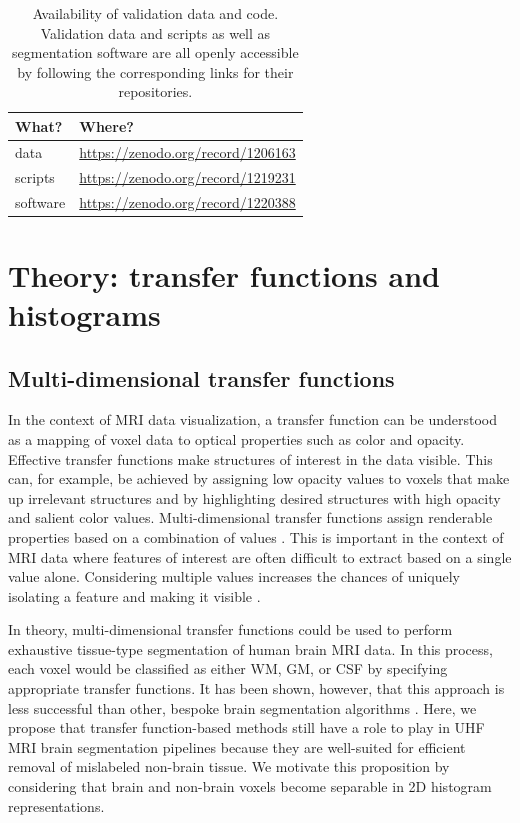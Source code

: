 \begin{table}[!ht]
\centering
\begin{tabular}{l l}
What? & Where? \\\hline
data & \url{https://zenodo.org/record/1206163}\\
scripts & \url{https://zenodo.org/record/1219231}\\
software & \url{https://zenodo.org/record/1220388}
\end{tabular}
\caption{\label{tab:availability}Availability of validation data and code. Validation data and scripts as well as segmentation software are all openly accessible by following the corresponding links for their repositories.}
\end{table}

\section{Theory: transfer functions and histograms}
\label{sec:Theory}

\subsection{Multi-dimensional transfer functions}
In the context of MRI data visualization, a transfer function can be understood as a mapping of voxel data to optical properties such as color and opacity. Effective transfer functions make structures of interest in the data visible. This can, for example, be achieved by assigning low opacity values to voxels that make up irrelevant structures and by highlighting desired structures with high opacity and salient color values. Multi-dimensional transfer functions assign renderable properties based on a combination of values \parencite{Kniss2002, Kindlmann1998, Kniss2005, Kniss2001}. This is important in the context of MRI data where features of interest are often difficult to extract based on a single value alone. Considering multiple values increases the chances of uniquely isolating a feature and making it visible \parencite{Kniss2002}.

In theory, multi-dimensional transfer functions could be used to perform exhaustive tissue-type segmentation of human brain MRI data. In this process, each voxel would be classified as either WM, GM, or CSF by specifying appropriate transfer functions. It has been shown, however, that this approach is less successful than other, bespoke brain segmentation algorithms \parencite{Ljung2016}. Here, we propose that transfer function-based methods still have a role to play in UHF MRI brain segmentation pipelines because they are well-suited for efficient removal of mislabeled non-brain tissue. We motivate this proposition by considering that brain and non-brain voxels become separable in 2D histogram representations.


